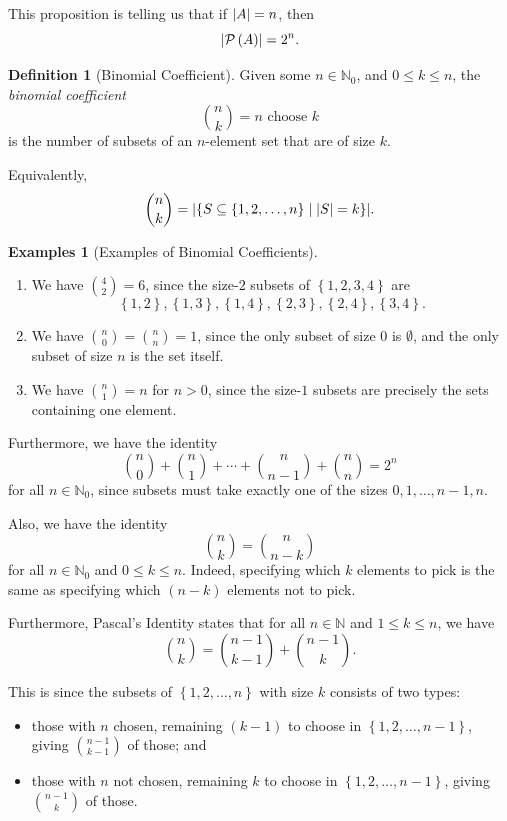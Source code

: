 \documentclass{article}
\theoremstyle{definition}
\newtheorem{definition}[theorem]{Definition}
\newtheorem{examples}[theorem]{Examples}
\theoremstyle{remark}
\DeclarePairedDelimiter{\abs}{\lvert}{\rvert}
\newcommand{\pqty}[1]{\left(#1\right)}
\newcommand{\Bqty}[1]{\left\{#1\right\}}
\newcommand{\set}[2]{\{#1\mid #2\}}
\newcommand{\powerset}{\mathcal{P}}
\newcommand{\NN}{\mathbb{N}}
\begin{document}
This proposition is telling us that if \(\abs{A} = n\), then
\[
    \abs{\powerset\pqty{A}} = 2^n.
\]

\begin{definition}[Binomial Coefficient]
    Given some \(n \in \NN_0\), and \(0 \leq k \leq n\), the \emph{binomial coefficient}
    \[
        \binom{n}{k} = n \text{ choose } k
    \]
    is the number of subsets of an \(n\)-element set that are of size \(k\).

    Equivalently,
    \[
        \binom{n}{k} = \abs{\set{S \subseteq \Bqty{1, 2, \ldots, n}}{\abs{S} = k}}.
    \]
\end{definition}

\begin{examples}[Examples of Binomial Coefficients]
    \begin{enumerate}
        \item We have \(\binom{4}{2} = 6\), since the size-\(2\) subsets of \(\Bqty{1, 2, 3, 4}\) are
        \[
            \Bqty{1, 2}, \Bqty{1, 3}, \Bqty{1, 4}, \Bqty{2, 3}, \Bqty{2, 4}, \Bqty{3, 4}.
        \]

        \item We have \(\binom{n}{0} = \binom{n}{n} = 1\), since the only subset of size \(0\) is \(\emptyset\), and the only subset of size \(n\) is the set itself.
        \item We have \(\binom{n}{1} = n\) for \(n > 0\), since the size-\(1\) subsets are precisely the sets containing one element.
    \end{enumerate}
\end{examples}

Furthermore, we have the identity
\[
    \binom{n}{0} + \binom{n}{1} + \cdots + \binom{n}{n - 1} + \binom{n}{n} = 2^n
\]
for all \(n \in \NN_0\), since subsets must take exactly one of the sizes \(0, 1, \ldots, n - 1, n\).

Also, we have the identity
\[
    \binom{n}{k} = \binom{n}{n - k}
\]
for all \(n \in \NN_0\) and \(0 \leq k \leq n\). Indeed, specifying which \(k\) elements to pick is the same as specifying which \(\pqty{n - k}\) elements not to pick.

Furthermore, Pascal's Identity states that for all \(n \in \NN\) and \(1 \leq k \leq n\), we have
\[
    \binom{n}{k} = \binom{n - 1}{k - 1} + \binom{n - 1}{k}.
\]

This is since the subsets of \(\Bqty{1, 2, \ldots, n}\) with size \(k\) consists of two types:
\begin{itemize}
    \item those with \(n\) chosen, remaining \(\pqty{k - 1}\) to choose in \(\Bqty{1, 2, \ldots, n - 1}\), giving \(\binom{n - 1}{k - 1}\) of those; and
    \item those with \(n\) not chosen, remaining \(k\) to choose in \(\Bqty{1, 2, \ldots, n - 1}\), giving \(\binom{n - 1}{k}\) of those.
\end{itemize}
\end{document}
